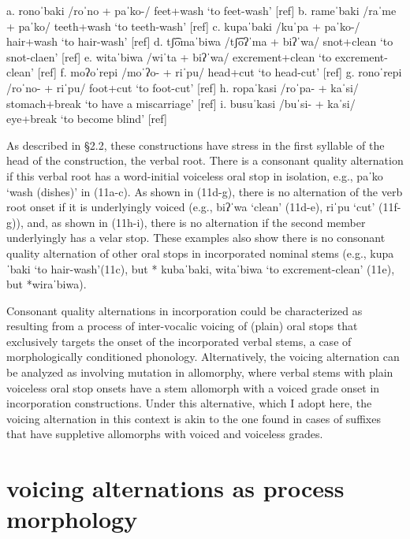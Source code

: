 a.	ronoˈbaki	 	/roˈno + paˈko-/	   	feet+wash		‘to feet-wash’		[ref]
b.	rameˈbaki		/raˈme + paˈko/	   	teeth+wash		‘to teeth-wash’		[ref]
c.	kupaˈbaki		/kuˈpa + paˈko-/   	hair+wash		‘to hair-wash’		[ref]
d.	tʃ͡omaˈbiwa 	/tʃ͡oʔˈma + biʔˈwa/	snot+clean		‘to snot-claen’		[ref]
e.	witaˈbiwa		/wiˈta +	 biʔˈwa/	excrement+clean	‘to excrement-clean’	[ref]
f.	moʔoˈrepi		/moˈʔo- + riˈpu/	head+cut		‘to head-cut’		[ref]
g.	ronoˈrepi		/roˈno- + riˈpu/		foot+cut		‘to foot-cut’ 		[ref]
h.	ropaˈkasi		/roˈpa- + kaˈsi/		stomach+break		‘to have a miscarriage’	[ref]
i.	busuˈkasi		/buˈsi- + kaˈsi/		eye+break		‘to become blind’	[ref]

As described in §2.2, these constructions have stress in the first syllable of the head of the construction, the verbal root. There is a consonant quality alternation if this verbal root has a word-initial voiceless oral stop in isolation, e.g., paˈko ‘wash (dishes)’ in (11a-c). As shown in (11d-g), there is no alternation of the verb root onset if it is underlyingly voiced (e.g., biʔˈwa ‘clean’ (11d-e), riˈpu ‘cut’ (11f-g)), and, as shown in (11h-i), there is no alternation if the second member underlyingly has a velar stop.  These examples also show there is no consonant quality alternation of other oral stops in incorporated nominal stems (e.g., kupaˈbaki ‘to hair-wash’(11c), but * kubaˈbaki, witaˈbiwa ‘to excrement-clean’ (11e), but *wiraˈbiwa).

Consonant quality alternations in incorporation could be characterized as resulting from a process of inter-vocalic voicing of (plain) oral stops that exclusively targets the onset of the incorporated verbal stems, a case of morphologically conditioned phonology. Alternatively, the voicing alternation can be analyzed as involving mutation in allomorphy, where verbal stems with plain voiceless oral stop onsets have a stem allomorph with a voiced grade onset in incorporation constructions. Under this alternative, which I adopt here, the voicing alternation in this context is akin to the one found in cases of suffixes that have suppletive allomorphs with voiced and voiceless grades.


\section{voicing alternations as process morphology}
\label{sec: voicing alternations as process morphology}

